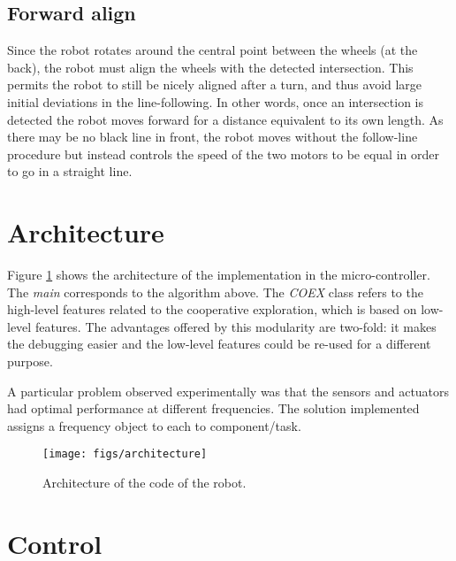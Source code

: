 \documentclass[12pt]{report}
\begin{document}
\subsection*{Forward align}
Since the robot rotates around the central point between the wheels (at the back), the robot must align the wheels with the detected intersection. This permits the robot to still be nicely aligned after a turn, and thus avoid large initial deviations in the line-following. In other words, once an intersection is detected the robot moves forward for a distance equivalent to its own length. As there may be no black line in front, the robot moves without the follow-line procedure but instead controls the speed of the two motors to be equal in order to go in a straight line.

\section{Architecture}\label{sec:archi}
Figure \ref{fig:architecture} shows the architecture of the implementation in the micro-controller. The \textit{main} corresponds to the algorithm above. The \textit{COEX} class refers to the high-level features related to the cooperative exploration, which is based on low-level features. The advantages offered by this modularity are two-fold: it makes the debugging easier and the low-level features could be re-used for a different purpose.

A particular problem observed experimentally was that the sensors and actuators had optimal performance at different frequencies. The solution implemented assigns a frequency object to each to component/task.

\begin{figure}[!h]
\centering
\texttt{[image: figs/architecture]}
\caption{Architecture of the code of the robot.}
\label{fig:architecture}
\end{figure}


\section{Control}
\end{document}
